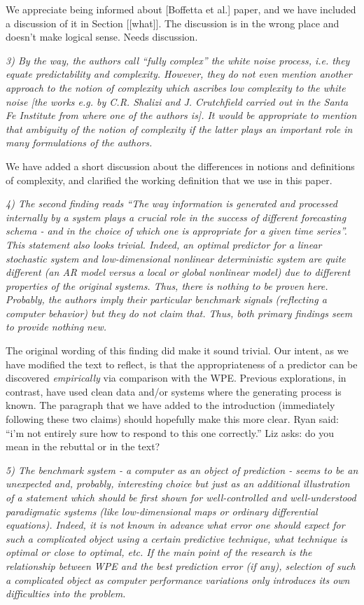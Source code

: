 \documentclass[12pt]{article}
\newcommand{\alert}[1]{{\color{red}#1}}
\begin{document}
\alert{We appreciate being informed about [Boffetta et al.]  paper,
  and we have included a discussion of it in \alert{Section [[what]].
    The discussion is in the wrong place and doesn't make logical
    sense.  Needs discussion.}

\emph{3) By the way, the authors call ``fully complex'' the white
  noise process, i.e. they equate predictability and
  complexity. However, they do not even mention another approach to
  the notion of complexity which ascribes low complexity to the white
  noise [the works e.g. by C.R. Shalizi and J. Crutchfield carried out
    in the Santa Fe Institute from where one of the authors is]. It
  would be appropriate to mention that ambiguity of the notion of
  complexity if the latter plays an important role in many
  formulations of the authors.}

We have added a short discussion about the differences in notions and
definitions of complexity, and clarified the working definition that
we use in this paper.

\emph{4) The second finding reads ``The way information is generated
  and processed internally by a system plays a crucial role in the
  success of different forecasting schema - and in the choice of which
  one is appropriate for a given time series''. This statement also
  looks trivial. Indeed, an optimal predictor for a linear stochastic
  system and low-dimensional nonlinear deterministic system are quite
  different (an AR model versus a local or global nonlinear model) due
  to different properties of the original systems. Thus, there is
  nothing to be proven here. Probably, the authors imply their
  particular benchmark signals (reflecting a computer behavior) but
  they do not claim that.  Thus, both primary findings seem to provide
  nothing new.}

The original wording of this finding did make it sound trivial.  Our
intent, as we have modified the text to reflect, is that the
appropriateness of a predictor can be discovered \emph{empirically}
via comparison with the WPE.  Previous explorations, in contrast, have
used clean data and/or systems where the generating process is known.
The paragraph that we have added to the introduction (immediately
following these two claims) should hopefully make this more clear.
\alert{Ryan said: ``i'm not entirely sure how to respond to this one
  correctly.''  Liz asks: do you mean in the rebuttal or in the text?}

\emph{5) The benchmark system - a computer as an object of prediction
  - seems to be an unexpected and, probably, interesting choice but
  just as an additional illustration of a statement which should be
  first shown for well-controlled and well-understood paradigmatic
  systems (like low-dimensional maps or ordinary differential
  equations). Indeed, it is not known in advance what error one should
  expect for such a complicated object using a certain predictive
  technique, what technique is optimal or close to optimal, etc. If
  the main point of the research is the relationship between WPE and
  the best prediction error (if any), selection of such a complicated
  object as computer performance variations only introduces its own
  difficulties into the problem.}

}
\end{document}
